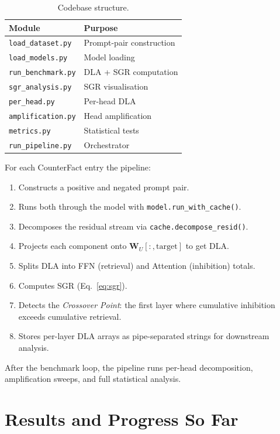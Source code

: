 \documentclass[11pt]{article}
\begin{document}
\begin{table}[h]
\centering\small
\begin{tabular}{@{}ll@{}}
\toprule
\textbf{Module} & \textbf{Purpose} \\
\midrule
\texttt{load\_dataset.py}   & Prompt-pair construction \\
\texttt{load\_models.py}    & Model loading \\
\texttt{run\_benchmark.py}  & DLA + SGR computation \\
\texttt{sgr\_analysis.py}   & SGR visualisation \\
\texttt{per\_head.py}       & Per-head DLA \\
\texttt{amplification.py}   & Head amplification \\
\texttt{metrics.py}         & Statistical tests \\
\texttt{run\_pipeline.py}   & Orchestrator \\
\bottomrule
\end{tabular}
\caption{Codebase structure.}
\label{tab:codebase}
\end{table}

For each CounterFact entry the pipeline:
\begin{enumerate}
\item Constructs a positive and negated prompt pair.
\item Runs both through the model with \verb|model.run_with_cache()|.
\item Decomposes the residual stream via \verb|cache.decompose_resid()|.
\item Projects each component onto $\mathbf{W}_U[:,\mathrm{target}]$ to get DLA.
\item Splits DLA into FFN (retrieval) and Attention (inhibition) totals.
\item Computes SGR (Eq.~\ref{eq:sgr}).
\item Detects the \emph{Crossover Point}: the first layer where cumulative
      inhibition exceeds cumulative retrieval.
\item Stores per-layer DLA arrays as pipe-separated strings for downstream analysis.
\end{enumerate}
After the benchmark loop, the pipeline runs per-head decomposition, amplification
sweeps, and full statistical analysis.

\section{Results and Progress So Far}
\label{sec:results}
\end{document}
